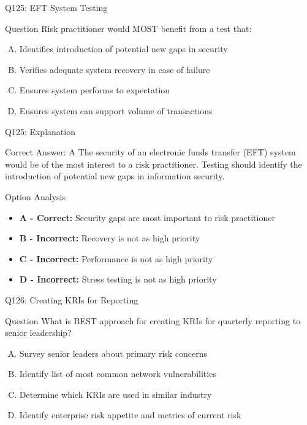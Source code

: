 \documentclass{beamer}
\begin{document}
	\begin{frame}{Q125: EFT System Testing}
		\begin{block}{Question}
			Risk practitioner would MOST benefit from a test that:
		\end{block}
		\begin{enumerate}[(A)]
			\item Identifies introduction of potential new gaps in security
			\item Verifies adequate system recovery in case of failure
			\item Ensures system performs to expectation
			\item Ensures system can support volume of transactions
		\end{enumerate}
	\end{frame}
	
	\begin{frame}{Q125: Explanation}
		\begin{block}{Correct Answer: A}
			The security of an electronic funds transfer (EFT) system would be of the most interest to a risk practitioner. Testing should identify the introduction of potential new gaps in information security.
		\end{block}
		\begin{block}{Option Analysis}
			\begin{itemize}
				\item \textbf{A - Correct:} Security gaps are most important to risk practitioner
				\item \textbf{B - Incorrect:} Recovery is not as high priority
				\item \textbf{C - Incorrect:} Performance is not as high priority
				\item \textbf{D - Incorrect:} Stress testing is not as high priority
			\end{itemize}
		\end{block}
	\end{frame}
	
	\begin{frame}{Q126: Creating KRIs for Reporting}
		\begin{block}{Question}
			What is BEST approach for creating KRIs for quarterly reporting to senior leadership?
		\end{block}
		\begin{enumerate}[(A)]
			\item Survey senior leaders about primary risk concerns
			\item Identify list of most common network vulnerabilities
			\item Determine which KRIs are used in similar industry
			\item Identify enterprise risk appetite and metrics of current risk
		\end{enumerate}
	\end{frame}
	
\end{document}
